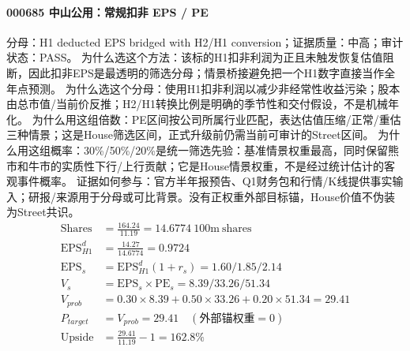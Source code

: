 \paragraph{000685 中山公用：常规扣非 EPS / PE}
分母：H1 deducted EPS bridged with H2/H1 conversion；证据质量：中高；审计状态：PASS。
为什么选这个方法：该标的H1扣非利润为正且未触发恢复估值阻断，因此扣非EPS是最透明的筛选分母；情景桥接避免把一个H1数字直接当作全年点预测。
为什么选这个分母：使用H1扣非利润以减少非经常性收益污染；股本由总市值/当前价反推；H2/H1转换比例是明确的季节性和交付假设，不是机械年化。
为什么用这组倍数：PE区间按公司所属行业匹配，表达估值压缩/正常/重估三种情景；这是House筛选区间，正式升级前仍需当前可审计的Street区间。
为什么用这组概率：30\%/50\%/20\%是统一筛选先验：基准情景权重最高，同时保留熊市和牛市的实质性下行/上行贡献；它是House情景权重，不是经过统计估计的客观事件概率。
证据如何参与：官方半年报预告、Q1财务包和行情/K线提供事实输入；研报/来源用于分母或可比背景。没有正权重外部目标锚，House价值不伪装为Street共识。
\begin{align*}
\mathrm{Shares} &= \frac{164.24}{11.19}=14.6774\ \mathrm{100m\ shares}\\
\mathrm{EPS}_{H1}^d &= \frac{14.27}{14.6774}=0.9724\\
\mathrm{EPS}_s &= \mathrm{EPS}_{H1}^d(1+r_s)=1.60/1.85/2.14\\
V_s &= \mathrm{EPS}_s\times \mathrm{PE}_s=8.39/33.26/51.34\\
V_{prob} &= 0.30\times 8.39+0.50\times 33.26+0.20\times 51.34=29.41\\
P_{target} &= V_{prob}=29.41\quad(\text{外部锚权重}=0)\\
\mathrm{Upside} &= \frac{29.41}{11.19}-1=162.8\%\\
\end{align*}


